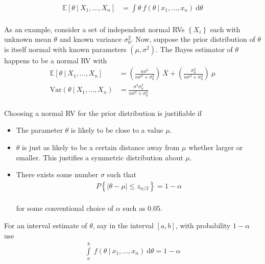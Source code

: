 \begin{align}
	\mathbb{E}[\theta\ |\ X_1, \dots, X_n] &= \int\limits \theta\ f(\theta\ |\ x_1, \dots, x_n)\ \mathrm{d}\theta
\end{align} \\

As an example, consider a set of independent normal RVs $ \left\{X_i\right\} $ each with unknown mean $ \theta $ and known variance $ \sigma_0^2 $. Now, suppose the prior distribution of $ \theta $ is itself normal with known parameters $ (\mu, \sigma^2) $. The Bayes estimator of $ \theta $ happens to be a normal RV with \\

\begin{align}
	\mathbb{E}[\theta\ |\ X_1, \dots, X_n] &= \left(\frac{n\sigma^2}{n\sigma^2 + \sigma_0^2}\right)\ \overline{X} + \left(\frac{\sigma_0^2}{n\sigma^2 + \sigma_0^2}\right)\ \mu \\
	\mathrm{Var}(\theta\ |\ X_1, \dots, X_n) &= \frac{\sigma^2 \sigma_0^2}{n\sigma^2 + \sigma_0^2}
\end{align} \\

Choosing a normal RV for the prior distribution is justifiable if \\


\begin{itemize}
	\item The parameter $ \theta $ is likely to be close to a value $ \mu $.
	
	\item $ \theta $ is just as likely to be a certain distance away from $ \mu $ whether larger or smaller. This justifies a symmetric distribution about $ \mu $.
	
	\item There exists some number $ \sigma $ such that \\
	\begin{align}
		P\left\{|\theta - \mu| \leq z_{\alpha/2}\right\} = 1- \alpha \nonumber
 	\end{align}\\
 	for some conventional choice of $ \alpha $ such as $ 0.05 $. 
\end{itemize}


For an interval estimate of $ \theta $, say in the interval $ [a,b] $, with probability $ 1-\alpha $ use \\

\begin{align}
	\int\limits_a^b \ f(\theta\ |\ x_1, \dots, x_n)\ \mathrm{d}\theta = 1 - \alpha
\end{align}








\newpage

